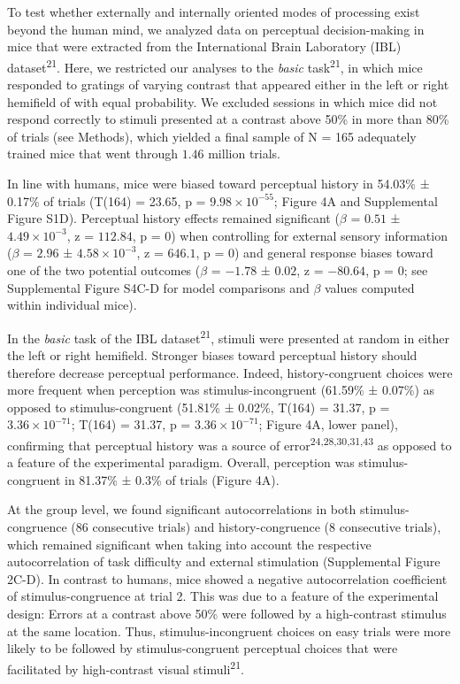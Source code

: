 \documentclass[
]{article}
\begin{document}
To test whether externally and internally oriented modes of processing
exist beyond the human mind, we analyzed data on perceptual
decision-making in mice that were extracted from the International Brain
Laboratory (IBL) dataset\textsuperscript{21}. Here, we restricted our
analyses to the \emph{basic} task\textsuperscript{21}, in which mice
responded to gratings of varying contrast that appeared either in the
left or right hemifield of with equal probability. We excluded sessions
in which mice did not respond correctly to stimuli presented at a
contrast above 50\% in more than 80\% of trials (see Methods), which
yielded a final sample of N = 165 adequately trained mice that went
through \(1.46\) million trials.

In line with humans, mice were biased toward perceptual history in
54.03\% ± 0.17\% of trials (T(164) = 23.65, p =
\(\ensuremath{9.98\times 10^{-55}}\); Figure 4A and Supplemental Figure
S1D). Perceptual history effects remained significant (\(\beta\) =
\(0.51\) ± \(\ensuremath{4.49\times 10^{-3}}\), z = \(112.84\), p =
\(0\)) when controlling for external sensory information (\(\beta\) =
\(2.96\) ± \(\ensuremath{4.58\times 10^{-3}}\), z = \(646.1\), p =
\(0\)) and general response biases toward one of the two potential
outcomes (\(\beta\) = \(-1.78\) ± \(0.02\), z = \(-80.64\), p = \(0\);
see Supplemental Figure S4C-D for model comparisons and \(\beta\) values
computed within individual mice).

In the \emph{basic} task of the IBL dataset\textsuperscript{21}, stimuli
were presented at random in either the left or right hemifield. Stronger
biases toward perceptual history should therefore decrease perceptual
performance. Indeed, history-congruent choices were more frequent when
perception was stimulus-incongruent (61.59\% ± 0.07\%) as opposed to
stimulus-congruent (51.81\% ± 0.02\%, T(164) = 31.37, p =
\(\ensuremath{3.36\times 10^{-71}}\); T(164) = 31.37, p =
\(\ensuremath{3.36\times 10^{-71}}\); Figure 4A, lower panel),
confirming that perceptual history was a source of
error\textsuperscript{24,28,30,31,43} as opposed to a feature of the
experimental paradigm. Overall, perception was stimulus-congruent in
81.37\% ± 0.3\% of trials (Figure 4A).

At the group level, we found significant autocorrelations in both
stimulus-congruence (86 consecutive trials) and history-congruence (8
consecutive trials), which remained significant when taking into account
the respective autocorrelation of task difficulty and external
stimulation (Supplemental Figure 2C-D). In contrast to humans, mice
showed a negative autocorrelation coefficient of stimulus-congruence at
trial 2. This was due to a feature of the experimental design: Errors at
a contrast above 50\% were followed by a high-contrast stimulus at the
same location. Thus, stimulus-incongruent choices on easy trials were
more likely to be followed by stimulus-congruent perceptual choices that
were facilitated by high-contrast visual stimuli\textsuperscript{21}.
\end{document}
